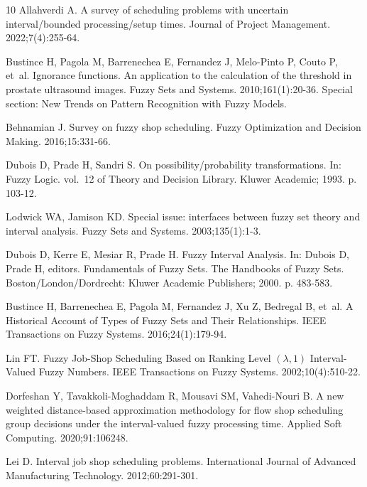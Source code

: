 \documentclass[icae]{iosart2x}
\begin{document}
\begin{thebibliography}{10}
Allahverdi A.
\newblock A survey of scheduling problems with uncertain interval/bounded
  processing/setup times.
\newblock Journal of Project Management. 2022;7(4):255-64.

Bustince H, Pagola M, Barrenechea E, Fernandez J, Melo-Pinto P, Couto P, et~al.
\newblock Ignorance functions. An application to the calculation of the
  threshold in prostate ultrasound images.
\newblock Fuzzy Sets and Systems. 2010;161(1):20-36.
\newblock Special section: New Trends on Pattern Recognition with Fuzzy Models.

Behnamian J.
\newblock Survey on fuzzy shop scheduling.
\newblock Fuzzy Optimization and Decision Making. 2016;15:331-66.

Dubois D, Prade H, Sandri S.
\newblock On possibility/probability transformations.
\newblock In: Fuzzy Logic. vol.~12 of Theory and Decision Library. Kluwer
  Academic; 1993. p. 103-12.

Lodwick WA, Jamison KD.
\newblock Special issue: interfaces between fuzzy set theory and interval
  analysis.
\newblock Fuzzy Sets and Systems. 2003;135(1):1-3.

Dubois D, Kerre E, Mesiar R, Prade H.
\newblock Fuzzy Interval Analysis.
\newblock In: Dubois D, Prade H, editors. Fundamentals of Fuzzy Sets. The
  Handbooks of Fuzzy Sets. Boston/London/Dordrecht: Kluwer Academic Publishers;
  2000. p. 483-583.

Bustince H, Barrenechea E, Pagola M, Fernandez J, Xu Z, Bedregal B, et~al.
\newblock A Historical Account of Types of Fuzzy Sets and Their Relationships.
\newblock IEEE Transactions on Fuzzy Systems. 2016;24(1):179-94.

Lin FT.
\newblock Fuzzy Job-Shop Scheduling Based on Ranking Level $(\lambda,1)$
  Interval-Valued Fuzzy Numbers.
\newblock IEEE Transactions on Fuzzy Systems. 2002;10(4):510-22.

Dorfeshan Y, Tavakkoli-Moghaddam R, Mousavi SM, Vahedi-Nouri B.
\newblock A new weighted distance-based approximation methodology for flow shop
  scheduling group decisions under the interval-valued fuzzy processing time.
\newblock Applied Soft Computing. 2020;91:106248.

Lei D.
\newblock Interval job shop scheduling problems.
\newblock International Journal of Advanced Manufacturing Technology.
  2012;60:291-301.


\end{thebibliography}
\end{document}
